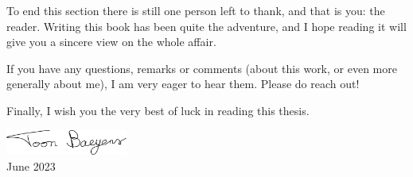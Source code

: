 To end this section there is still one person left to thank, and that is you: the reader. Writing this book has been quite the adventure, and I hope reading it will give you a sincere view on the whole affair.


If you have any questions, remarks or comments (about this work, or even more generally about me), I am very eager to hear them. Please do reach out!

Finally, I wish you the very best of luck in reading this thesis.


\begin{flushright}
    \includegraphics[width=4cm]{img/signature.pdf}\\
    June 2023
\end{flushright}

\stopchapter

